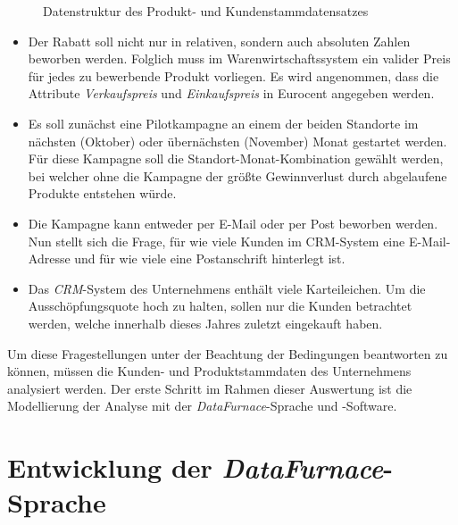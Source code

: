 \documentclass[
  language=german, %
  type=bachelor,%
  ngerman
]{isthesis}
\begin{document}
\begin{content}
  \begin{figure}
    \resizebox{250pt}{!}{}
    \caption{Datenstruktur des Produkt- und Kundenstammdatensatzes}\label{example-use-case-data}
  \end{figure}

  \begin{itemize}

    \item Der Rabatt soll nicht nur in relativen, sondern auch absoluten Zahlen
      beworben werden. Folglich muss im Warenwirtschaftssystem ein valider
      Preis für jedes zu bewerbende Produkt vorliegen. Es wird angenommen, dass
      die Attribute \textit{Verkaufspreis} und \textit{Einkaufspreis} in
      Eurocent angegeben werden.

    \item Es soll zunächst eine Pilotkampagne an einem der beiden Standorte im
      nächsten (Oktober) oder übernächsten (November) Monat gestartet werden.
      Für diese Kampagne soll die Standort-Monat-Kombination gewählt werden,
      bei welcher ohne die Kampagne der größte Gewinnverlust durch abgelaufene
      Produkte entstehen würde.

    \item Die Kampagne kann entweder per E-Mail oder per Post beworben werden.
      Nun stellt sich die Frage, für wie viele Kunden im \acrshort{CRM}-System
      eine E-Mail-Adresse und für wie viele eine Postanschrift hinterlegt ist.

    \item Das \textit{CRM}-System des Unternehmens enthält viele Karteileichen.
      Um die Ausschöpfungsquote hoch zu halten, sollen nur die Kunden
      betrachtet werden, welche innerhalb dieses Jahres zuletzt eingekauft
      haben.

  \end{itemize}

  Um diese Fragestellungen unter der Beachtung der Bedingungen beantworten zu
  können, müssen die Kunden- und Produktstammdaten des Unternehmens analysiert
  werden. Der erste Schritt im Rahmen dieser Auswertung ist die Modellierung
  der Analyse \zB{} mit der \textit{DataFurnace}-Sprache und -Software.

  \chapter{Entwicklung der \textit{DataFurnace}-Sprache}\label{ch:entwicklung-datafurnace-sprache}


\end{content}
\end{document}
